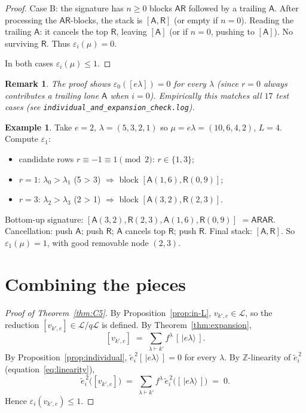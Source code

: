 \documentclass[11pt]{article}
\newtheorem{remark}[theorem]{Remark}
\theoremstyle{definition}
\newtheorem{example}[theorem]{Example}
\newcommand{\vke}{v_{k',e}}
\newcommand{\ZZ}{\mathbb{Z}}
\newcommand{\Lcr}{\mathcal{L}}
\newcommand{\ee}{\tilde e}
\newcommand{\eps}{\varepsilon}
\newcommand{\Aa}{{\mathsf A}}
\newcommand{\Rr}{{\mathsf R}}
\begin{document}
\begin{proof}
Case B: the signature has $n \ge 0$ blocks $\Aa\Rr$ followed by a trailing
$\Aa$. After processing the $\Aa\Rr$-blocks, the stack is $[\Aa, \Rr]$
(or empty if $n = 0$). Reading the trailing $\Aa$: it cancels the top $\Rr$,
leaving $[\Aa]$ (or if $n = 0$, pushing to $[\Aa]$). No surviving $\Rr$.
Thus $\eps_i(\mu) = 0$.

In both cases $\eps_i(\mu) \le 1$.
\end{proof}

\begin{remark}\label{rmk:zero-when-i-zero}
The proof shows $\eps_0([e\lambda]) = 0$ for every $\lambda$ (since $r = 0$
always contributes a trailing lone $\Aa$ when $i = 0$). Empirically this
matches all $17$ test cases (see
\verb|individual_and_expansion_check.log|).
\end{remark}

\begin{example}\label{ex:sig-2-4-2}
Take $e = 2$, $\lambda = (5, 3, 2, 1)$ so $\mu = e\lambda = (10, 6, 4, 2)$,
$L = 4$. Compute $\eps_1$:
\begin{itemize}
  \item candidate rows $r \equiv -1 \equiv 1 \pmod 2$: $r \in \{1, 3\}$;
  \item $r = 1$: $\lambda_0 > \lambda_1$ (5 > 3) $\Rightarrow$ block $[\Aa(1,6), \Rr(0,9)]$;
  \item $r = 3$: $\lambda_2 > \lambda_3$ (2 > 1) $\Rightarrow$ block $[\Aa(3,2), \Rr(2,3)]$.
\end{itemize}
Bottom-up signature: $[\Aa(3,2), \Rr(2,3), \Aa(1,6), \Rr(0,9)]$
$= \Aa\Rr\Aa\Rr$. Cancellation: push $\Aa$; push $\Rr$; $\Aa$ cancels
top $\Rr$; push $\Rr$. Final stack: $[\Aa, \Rr]$. So $\eps_1(\mu) = 1$,
with good removable node $(2, 3)$.
\end{example}

\section{Combining the pieces}\label{sec:combine}

\begin{proof}[Proof of Theorem~\ref{thm:C5}]
By Proposition~\ref{prop:in-L}, $\vke \in \Lcr$, so the reduction
$[\vke] \in \Lcr/q\Lcr$ is defined. By Theorem~\ref{thm:expansion},
\[
  [\vke] \;=\; \sum_{\lambda \vdash k'} f^\lambda \,[\,|e\lambda\rangle\,].
\]
By Proposition~\ref{prop:individual}, $\ee_i^{\,2}[\,|e\lambda\rangle\,] = 0$
for every $\lambda$. By $\ZZ$-linearity of $\ee_i^{\,2}$
(equation~\eqref{eq:linearity}),
\[
  \ee_i^{\,2}\bigl([\vke]\bigr)
  \;=\; \sum_{\lambda \vdash k'} f^\lambda \,\ee_i^{\,2}\bigl([\,|e\lambda\rangle\,]\bigr)
  \;=\; 0.
\]
Hence $\eps_i(\vke) \le 1$.
\end{proof}
\end{document}
